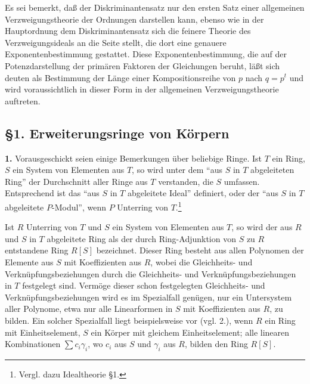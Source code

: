 \documentclass[11pt]{article}
\begin{document}
Es sei bemerkt, daß der Diskriminantensatz nur den ersten Satz einer allgemeinen Verzweigungstheorie der Ordnungen darstellen kann, ebenso wie in der Hauptordnung dem Diskriminantensatz sich die feinere Theorie des Verzweigungsideals an die Seite stellt, die dort eine genauere Exponentenbestimmung gestattet. Diese Exponentenbestimmung, die auf der Potenzdarstellung der primären Faktoren der Gleichungen beruht, läßt sich deuten als Bestimmung der Länge einer Kompositionsreihe von $p$ nach $q=p^t$ und wird voraussichtlich in dieser Form in der allgemeinen Verzweigungstheorie auftreten.

\subsection*{\S 1. Erweiterungsringe von Körpern}

\textbf{1.} Vorausgeschickt seien einige Bemerkungen über beliebige Ringe. Ist $T$ ein Ring, $S$ ein System von Elementen aus $T$, so wird unter dem ``aus $S$ in $T$ abgeleiteten Ring'' der Durchschnitt aller Ringe aus $T$ verstanden, die $S$ umfassen. Entsprechend ist das ``aus $S$ in $T$ abgeleitete Ideal'' definiert, oder der ``aus $S$ in $T$ abgeleitete $P$-Modul'', wenn $P$ Unterring von $T$.\footnote{Vergl. dazu Idealtheorie \S 1.}

Ist $R$ Unterring von $T$ und $S$ ein System von Elementen aus $T$, so wird der aus $R$ und $S$ in $T$ abgeleitete Ring als der durch Ring-Adjunktion von $S$ zu $R$ entstandene Ring $R[S]$ bezeichnet. Dieser Ring besteht aus allen Polynomen der Elemente aus $S$ mit Koeffizienten aus $R$, wobei die Gleichheits- und Verknüpfungsbeziehungen durch die Gleichheits- und Verknüpfungsbeziehungen in $T$ festgelegt sind. Vermöge dieser schon festgelegten Gleichheits- und Verknüpfungsbeziehungen wird es im Spezialfall genügen, nur ein Untersystem aller Polynome, etwa nur alle Linearformen in $S$ mit Koeffizienten aus $R$, zu bilden. Ein solcher Spezialfall liegt beispielsweise vor (vgl. 2.), wenn $R$ ein Ring mit Einheitselement, $S$ ein Körper mit gleichem Einheitselement; alle linearen Kombinationen $\sum c_i\gamma_i$, wo $c_i$ aus $S$ und $\gamma_i$ aus $R$, bilden den Ring $R[S]$.
\end{document}
